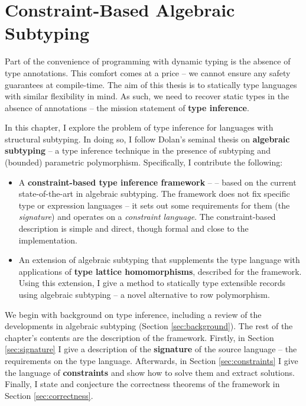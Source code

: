 \newcommand{\mlsub}{\textsc{MLsub}}
\newcommand{\simplesub}{\textsc{Simple-sub}}
\newcommand{\mlstruct}{\textsc{MLstruct}}
\newenvironment{example}{ %
    \begin{tcolorbox}[ %
        colback=blue!5!white, %
        colframe=blue!60!black, %
        title=\textsc{Example} %
    ] %
}{ %
    \end{tcolorbox} %
}

\chapter{Constraint-Based Algebraic Subtyping}
\label{algebraic-subtyping}

Part of the convenience of programming with dynamic typing is the absence of type annotations. 
This comfort comes at a price -- we cannot ensure any safety guarantees at compile-time. 
The aim of this thesis is to statically type languages with similar flexibility in mind. As such, we need to recover static types in the absence of annotations -- the mission statement of \textbf{type inference}.

In this chapter, I explore the problem of type inference for languages with structural subtyping. In doing so, I follow Dolan's seminal thesis on \textbf{algebraic subtyping} -- a type inference technique in the presence of subtyping and (bounded) parametric polymorphism. Specifically, I contribute the following:
\begin{itemize}
    \item A \textbf{constraint-based type inference framework} -- \inference{} -- based on the current state-of-the-art in algebraic subtyping. The framework does not fix specific type or expression languages -- it sets out some requirements for them (the \textit{signature}) and operates on a \emph{constraint language}. The constraint-based description is simple and direct, though formal and close to the implementation. 
    \item An extension of algebraic subtyping that supplements the type language with applications of \textbf{type lattice homomorphisms}, described for the framework. Using this extension, I give a method to statically type extensible records using algebraic subtyping -- a novel alternative to row polymorphism. 
\end{itemize}

We begin with background on type inference, including a review of the developments in algebraic subtyping (Section \ref{sec:background}). The rest of the chapter's contents are the description of the framework. Firstly, in Section \ref{sec:signature} I give a description of the \textbf{signature} of the source language -- the requirements on the type language. Afterwards, in Section \ref{sec:constraints} I give the language of \textbf{constraints} and show how to solve them and extract solutions. Finally, I state and conjecture the correctness theorems of the framework in Section \ref{sec:correctness}. 

